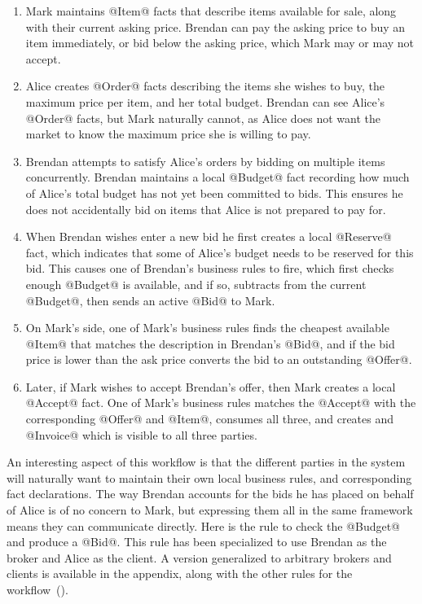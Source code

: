 \begin{enumerate}
\item Mark maintains @Item@ facts that describe items available for sale, along with their current asking price. Brendan can pay the asking price to buy an item immediately, or bid below the asking price, which Mark may or may not accept.

\item Alice creates @Order@ facts describing the items she wishes to buy, the maximum price per item, and her total budget. Brendan can see Alice's @Order@ facts, but Mark naturally cannot, as Alice does not want the market to know the maximum price she is willing to pay.

\item Brendan attempts to satisfy Alice's orders by bidding on multiple items concurrently. Brendan maintains a local @Budget@ fact recording how much of Alice's total budget has not yet been committed to bids. This ensures he does not accidentally bid on items that Alice is not prepared to pay for.

\item When Brendan wishes enter a new bid he first creates a local @Reserve@ fact, which indicates that some of Alice's budget needs to be reserved for this bid. This causes one of Brendan's business rules to fire, which first checks enough @Budget@ is available, and if so, subtracts from the current @Budget@, then sends an active @Bid@ to Mark.

\item On Mark's side, one of Mark's business rules finds the cheapest available @Item@ that matches the description in Brendan's @Bid@, and if the bid price is lower than the ask price converts the bid to an outstanding @Offer@.

\item Later, if Mark wishes to accept Brendan's offer, then Mark creates a local @Accept@ fact. One of Mark's business rules matches the @Accept@ with the corresponding @Offer@ and @Item@, consumes all three, and creates and @Invoice@ which is visible to all three parties.
\end{enumerate}

An interesting aspect of this workflow is that the different parties in the system will naturally want to maintain their own local business rules, and corresponding fact declarations. The way Brendan accounts for the bids he has placed on behalf of Alice is of no concern to Mark, but expressing them all in the same framework means they can communicate directly. Here is the rule to check the @Budget@ and produce a @Bid@. This rule has been specialized to use Brendan as the broker and Alice as the client. A version generalized to arbitrary brokers and clients is available in the appendix, along with the other rules for the workflow~().

